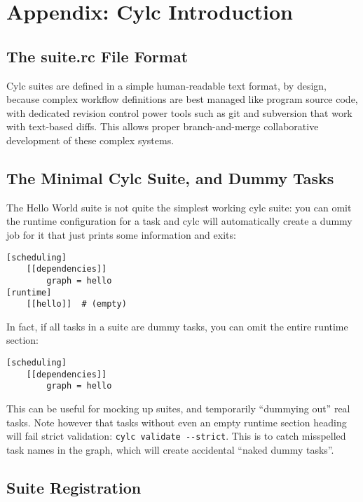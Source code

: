 \section{Appendix: Cylc Introduction}
\label{Appendix Cylc Introduction}


\subsection{The suite.rc File Format}

Cylc suites are defined in a simple human-readable text format, by design,
because complex workflow definitions are best managed like program source code,
with dedicated revision control power tools such as git and subversion that
work with text-based diffs.  This allows proper branch-and-merge collaborative
development of these complex systems.

\subsection{The Minimal Cylc Suite, and Dummy Tasks}

The Hello World suite is not quite the simplest working cylc suite: you can
omit the runtime configuration for a task and cylc will automatically create a
dummy job for it that just prints some information and exits:

\begin{lstlisting}[language=suiterc]
[scheduling]
    [[dependencies]]
        graph = hello
[runtime]
    [[hello]]  # (empty)
\end{lstlisting}

In fact, if all tasks in a suite are dummy tasks, you can omit the entire
runtime section:
\begin{lstlisting}[language=suiterc]
[scheduling]
    [[dependencies]]
        graph = hello
\end{lstlisting}

This can be useful for mocking up suites, and temporarily ``dummying out'' real
tasks.  Note however that tasks without even an empty runtime section heading
will fail strict validation: \lstinline=cylc validate --strict=.  This is to
catch misspelled task names in the graph, which will create accidental ``naked
dummy tasks''.

\subsection{Suite Registration}

